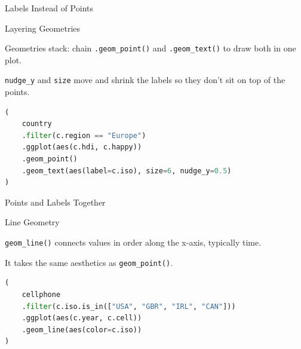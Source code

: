 \documentclass[8pt,aspectratio=169]{beamer}
\begin{document}
\begin{rightframe}{Labels Instead of Points}
\end{rightframe}

\begin{frame}[fragile]{Layering Geometries}
\begin{splitcode}{%

Geometries stack: chain \texttt{.geom\_point()} and \texttt{.geom\_text()} to draw both in one plot.

\texttt{nudge\_y} and \texttt{size} move and shrink the labels so they don't sit on top of the points.

}
\begin{lstlisting}[language=Python]
(
    country
    .filter(c.region == "Europe")
    .ggplot(aes(c.hdi, c.happy))
    .geom_point()
    .geom_text(aes(label=c.iso), size=6, nudge_y=0.5)
)
\end{lstlisting}
\end{splitcode}
\end{frame}

\begin{rightframe}{Points and Labels Together}
\end{rightframe}

\begin{frame}[fragile]{Line Geometry}
\begin{splitcode}{%

\texttt{geom\_line()} connects values in order along the x-axis, typically time.

It takes the same aesthetics as \texttt{geom\_point()}.

}
\begin{lstlisting}[language=Python]
(
    cellphone
    .filter(c.iso.is_in(["USA", "GBR", "IRL", "CAN"]))
    .ggplot(aes(c.year, c.cell))
    .geom_line(aes(color=c.iso))
)
\end{lstlisting}
\end{splitcode}
\end{frame}
\end{document}
